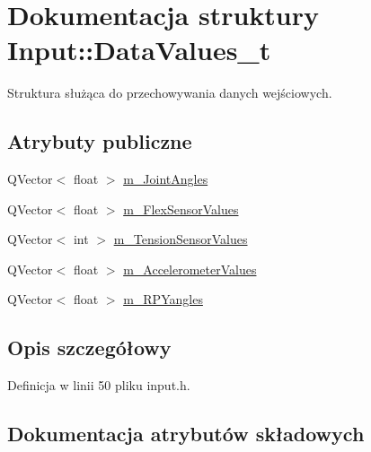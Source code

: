 \hypertarget{struct_input_1_1_data_values__t}{}\section{Dokumentacja struktury Input\+:\+:Data\+Values\+\_\+t}
\label{struct_input_1_1_data_values__t}


Struktura służąca do przechowywania danych wejściowych.  


\subsection*{Atrybuty publiczne}
\begin{DoxyCompactItemize}
\item 
Q\+Vector$<$ float $>$ \hyperlink{struct_input_1_1_data_values__t_aa8b83aee7b9ad21d4daf061389f7fc06}{m\+\_\+\+Joint\+Angles}
\item 
Q\+Vector$<$ float $>$ \hyperlink{struct_input_1_1_data_values__t_a4907ab345caaeec822b44e43b6e6931d}{m\+\_\+\+Flex\+Sensor\+Values}
\item 
Q\+Vector$<$ int $>$ \hyperlink{struct_input_1_1_data_values__t_af7c9130fde76cd77104840c5e51c2f2a}{m\+\_\+\+Tension\+Sensor\+Values}
\item 
Q\+Vector$<$ float $>$ \hyperlink{struct_input_1_1_data_values__t_adb4a210da1f4737abefe43c7d10e2e5e}{m\+\_\+\+Accelerometer\+Values}
\item 
Q\+Vector$<$ float $>$ \hyperlink{struct_input_1_1_data_values__t_a1b28ee801be2b29c938c142bb06782a0}{m\+\_\+\+R\+P\+Yangles}
\end{DoxyCompactItemize}


\subsection{Opis szczegółowy}


Definicja w linii 50 pliku input.\+h.



\subsection{Dokumentacja atrybutów składowych}
\mbox{\label{struct_input_1_1_data_values__t_adb4a210da1f4737abefe43c7d10e2e5e}} 
